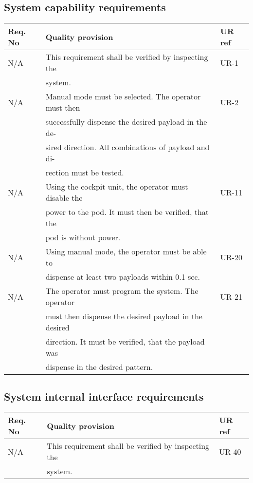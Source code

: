 \subsection{System capability requirements}
\begin{center}
    \begin{tabular}{ | l | l | l |}
    \hline	  
    Req. No & Quality provision  									& UR ref \\ \hline
		N/A & This requirement shall be verified by inspecting the  & UR-1 \\
            & system.                                               &\\ \hline
		N/A & Manual mode must be selected. The operator must then  & UR-2 \\
			& successfully dispense the desired payload in the de-  &\\
			& sired direction. All combinations of payload and di-  &\\
            & rection must be tested.                               &\\ \hline
		N/A & Using the cockpit unit, the operator must disable the	& UR-11 \\
			& power to the pod. It must then be verified, that the	&\\
			& pod is without power.                                 &\\ \hline	
        N/A & Using manual mode, the operator must be able to       & UR-20 \\
			& dispense at least two payloads within 0.1 sec.        &\\ \hline	 
        N/A & The operator must program the system. The operator    & UR-21 \\
			& must then dispense the desired payload in the desired &\\ 
            & direction. It must be verified, that the payload was  &\\    
            & dispense in the desired pattern.                      &\\ \hline	            
    \end{tabular}
\end{center}

\subsection{System internal interface requirements}
\begin{center}
    \begin{tabular}{ | l | l | l |}
    \hline	  
    Req. No & Quality provision  									& UR ref \\ \hline
		N/A & This requirement shall be verified by inspecting the  & UR-40 \\
            & system.                                               &\\ \hline           
    \end{tabular}
\end{center}
